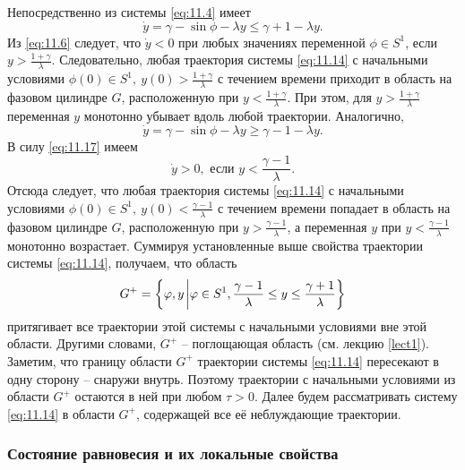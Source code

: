 Непосредственно из системы \eqref{eq:11.4} имеет
\begin{equation}
        \label{eq:11.16}
        \dot y = \gamma - \sin \phi - \lambda y \leq \gamma+1 - \lambda y.
\end{equation}
Из \eqref{eq:11.6} следует, что $\dot y <0$ при любых значениях переменной $\phi \in S^1$,
если $y > \frac{1+\gamma}{\lambda}$. Следовательно, любая траектория системы \eqref{eq:11.14} 
с начальными условиями $\phi(0) \in S^1, ~ y(0) > \frac{1+\gamma}{\lambda}$ с течением времени приходит
в область на фазовом цилиндре $G$, расположенную при $y< \frac{1+\gamma}{\lambda}$. При этом, для 
$y> \frac{1+\gamma}{\lambda}$ переменная $y$ монотонно убывает вдоль любой траектории.
Аналогично,
\begin{equation}
        \label{eq:11.17}
 \dot y = \gamma - \sin \phi - \lambda y \geq \gamma - 1 - \lambda y.       
\end{equation}
В силу \eqref{eq:11.17} имеем
\begin{equation}
        \label{eq:}
        \dot y > 0, \text{ если } y< \frac{\gamma-1}{\lambda}.
\end{equation}
Отсюда следует, что любая траектория системы \eqref{eq:11.14} с 
начальными условиями $\phi(0) \in S^1,~y(0)< \frac{\gamma-1}{\lambda}$ с течением времени попадает в
область на фазовом цилиндре $G$, расположенную при $y>\frac{\gamma-1}{\lambda}$, а переменная $y$ 
при $y<\frac{\gamma-1}{\lambda}$ монотонно возрастает. Суммируя установленные выше свойства траектории 
системы \eqref{eq:11.14}, получаем, что область
\begin{equation}
        \label{eq:}
        G^{+} = \qty{ \phi,y\eval \phi \in S^{1}, \frac{\gamma-1}{\lambda}\leq y \leq \frac{\gamma+1}{\lambda} }
\end{equation}
притягивает все траектории этой системы с начальными условиями вне этой области.
Другими словами, $G^+$ -- поглощающая область (см. лекцию \ref{lect1}). 
Заметим, что границу области  $G^+$ траектории системы \eqref{eq:11.14}
пересекают в одну сторону -- снаружи внутрь. Поэтому траектории с начальными условиями из области
$G^+$ остаются в ней при любом $\tau>0$. Далее будем рассматривать систему \eqref{eq:11.14} 
в области $G^+$, содержащей все её неблуждающие траектории.

\subsubsection{Состояние равновесия и их локальные свойства}%
\label{ssub:11.3.2b}

